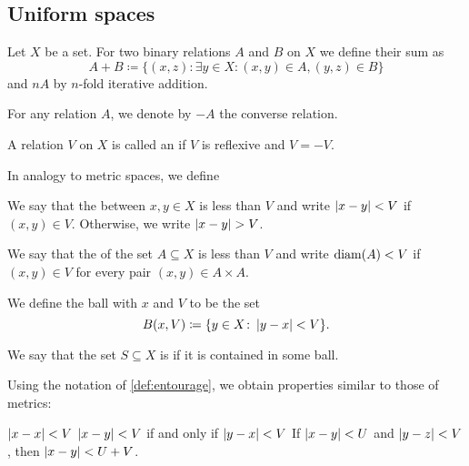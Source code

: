 \subsection{Uniform spaces}\label{subsec:uniform_spaces}

\begin{definition}\label{def:entourage}\cite[section 8.1]{Engelking1989}
  Let \( X \) be a set. For two binary relations \( A \) and \( B \) on \( X \) we define their sum as
  \begin{equation*}
    A + B \coloneqq \{ (x, z) \colon \exists y \in X: (x, y) \in A, (y, z) \in B \}
  \end{equation*}
  and \( nA \) by \( n \)-fold iterative addition.

  For any relation \( A \), we denote by \( -A \) the converse relation.

  A relation \( V \) on \( X \) is called an  if \( V \) is reflexive and \( V = -V \).

  In analogy to metric spaces, we define
  \begin{defenum}
     We say that the  between \( x, y \in X \) is less than \( V \) and write \( \left\vert x - y \right\vert < V \) if \( (x, y) \in V \). Otherwise, we write \( \left\vert x - y \right\vert > V \).

     We say that the  of the set \( A \subseteq X \) is less than \( V \) and write \( \operatorname{diam}(A) < V \) if \( (x, y) \in V \) for every pair \( (x, y) \in A \times A \).

     We define the ball with  \( x \) and  \( V \) to be the set
    \begin{equation*}
      B(x, V) \coloneqq \{ y \in X \colon \left\vert y - x \right\vert < V \}.
    \end{equation*}

     We say that the set \( S \subseteq X \) is  if it is contained in some ball.
  \end{defenum}
\end{definition}

\begin{proposition}\label{thm:entourage_simulates_metric}\cite[section 8.1]{Engelking1989}
  Using the notation of \cref{def:entourage}, we obtain properties similar to those of metrics:
  \begin{description}
     \( \left\vert x - x \right\vert < V \)
     \( \left\vert x - y \right\vert < V \) if and only if \( \left\vert y - x \right\vert < V \)
     If \( \left\vert x - y \right\vert < U \) and \( \left\vert y - z \right\vert < V \), then \( \left\vert x - y \right\vert < U + V \).
  \end{description}
\end{proposition}

